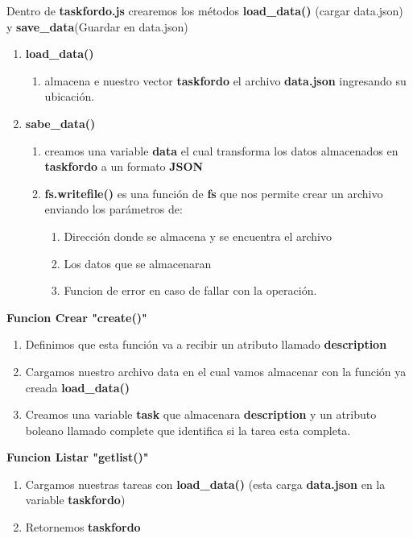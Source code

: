 \documentclass{report}
\begin{document}
Dentro de \textbf{task\-for\-do.js} crearemos los métodos \textbf{load\_data()} (cargar data.json) y \textbf{save\_data}(Guardar en data.json)

\begin{enumerate}
  \item \textbf{load\_data()}
  \begin{enumerate}
    \item almacena e nuestro vector \textbf{taskfordo} el archivo \textbf{data.json}  ingresando su ubicación.
  \end{enumerate}
  \item \textbf{sabe\_data()}
  \begin{enumerate}
    \item creamos una variable \textbf{data} el cual transforma los datos almacenados en \textbf{taskfordo} a un formato \textbf{JSON}
    \item \textbf{fs.writefile()} es una función de \textbf{fs} que nos permite crear un archivo enviando los parámetros de: 
    \begin{enumerate}
      \item Dirección donde se almacena y se encuentra el archivo
      \item Los datos que se almacenaran
      \item Funcion de error en caso de fallar con la operación.
    \end{enumerate}
  \end{enumerate}
\end{enumerate}

\textbf{Funcion Crear "create()"}


\begin{enumerate}
  \item Definimos que esta función va a recibir un atributo llamado \textbf{description}
  \item Cargamos nuestro archivo data en el cual vamos almacenar con la función ya creada \textbf{load\_data()}
  \item Creamos una variable \textbf{task} que almacenara \textbf{description} y un atributo boleano llamado complete que identifica si la tarea esta completa.
\end{enumerate}

\textbf{Funcion Listar "getlist()"}

\begin{enumerate}
  \item Cargamos nuestras tareas con \textbf{load\_data()} (esta carga \textbf{data.json} en la variable \textbf{taskfordo})
  \item Retornemos \textbf{taskfordo}
\end{enumerate}
\end{document}
